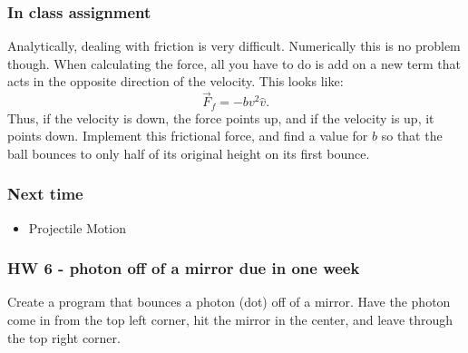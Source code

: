 \documentclass{beamer}
\begin{document}
\begin{frame}
  \frametitle{In class assignment}
  Analytically, dealing with friction is very difficult. 
  Numerically this is no problem though.
  When calculating the force, all you have to do is add on a 
  new term that acts in the opposite direction
  of the velocity. This looks like:
  \begin{equation}
    \vec{F}_f = -bv^2\hat{v}.
  \end{equation}
  Thus, if the velocity is down, the force points up, 
  and if the velocity is up, it points down. Implement this
  frictional force, and find a value for $b$ so that the ball 
  bounces to only half of its original height on its first bounce.
\end{frame}

\begin{frame}
  \frametitle{Next time}
  \begin{itemize}
  \item Projectile Motion
  \end{itemize}
\end{frame}

\begin{frame}
  \frametitle{HW 6 - photon off of a mirror due in one week}
  Create a program that bounces a photon (dot) off of a mirror. Have
  the photon come in from the top left corner, hit the mirror in the center,
  and leave through the top right corner.
\end{frame}
\end{document}
